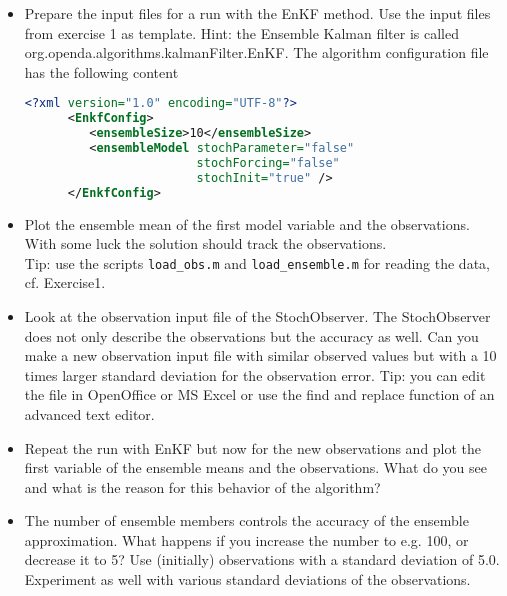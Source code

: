 \documentclass[a4paper,10pt]{article}
\begin{document}
\begin{itemize}
  \item Prepare the input files for a run with the EnKF method. Use the input
        files from exercise 1 as template. Hint: the Ensemble Kalman filter
        is called org.openda.algorithms.kalmanFilter.EnKF. The algorithm
        configuration file has the following content
      \begin{lstlisting}[language=XML,frame=single,caption={XML-input for EnKF algorithm}]
      <?xml version="1.0" encoding="UTF-8"?>
      <EnkfConfig>
         <ensembleSize>10</ensembleSize>
         <ensembleModel stochParameter="false"
                        stochForcing="false"
                        stochInit="true" />
      </EnkfConfig>
      \end{lstlisting}

  \item Plot the ensemble mean of the first model variable and the observations.
        With some luck the solution should track the observations.\\
        Tip: use the scripts {\tt load\_obs.m} and {\tt load\_ensemble.m} for reading the
        data, cf. Exercise1.
 \item Look at the observation input file of the StochObserver. The
       StochObserver does not only describe the observations but the accuracy
       as well. Can you make a new observation input file with similar
       observed values but with a 10 times larger standard deviation for the
       observation error.
       Tip: you can edit the file in OpenOffice or MS Excel or use the find
       and replace function of an advanced text editor.
 \item Repeat the run with EnKF but now for the new observations and plot
       the first variable of the ensemble means and the observations. What do
       you see and what is the reason for this behavior of the algorithm?
 \item The number of ensemble members controls the accuracy of the ensemble
       approximation. What happens if you increase the number to e.g. 100, or
       decrease it to 5? Use (initially) observations with a standard deviation
       of 5.0. Experiment as well with various standard
       deviations of the observations.
\end{itemize}

\end{document}
